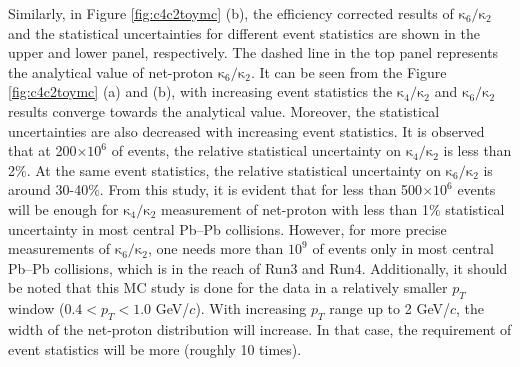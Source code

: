 Similarly, in Figure \ref{fig:c4c2toymc} (b), the efficiency corrected results of $\mathrm{\kappa}_{6}/\mathrm{\kappa}_{2}$ and the statistical uncertainties for different event statistics are shown in the upper and lower panel, respectively. The dashed line in the top panel represents the analytical value of net-proton $\mathrm{\kappa}_{6}/\mathrm{\kappa}_{2}$. It can be seen from the Figure \ref{fig:c4c2toymc} (a) and (b), with increasing event statistics the $\mathrm{\kappa}_{4}/\mathrm {\kappa}_{2}$ and $\mathrm{\kappa}_{6}/\mathrm{\kappa}_{2}$ results converge towards the analytical value. Moreover, the statistical uncertainties are also decreased with increasing event statistics. It is observed that at 200$\times 10^{6}$ of events, the relative statistical uncertainty on $\mathrm{\kappa}_{4}/\mathrm {\kappa}_{2}$ is less than 2$\%$. At the same event statistics, the relative statistical uncertainty on $\mathrm{\kappa}_{6}/\mathrm{\kappa}_{2}$ is around 30-40$\%$. From this study, it is evident that for less than 500$\times 10^{6}$ events will be enough for $\mathrm{\kappa}_{4}/\mathrm {\kappa}_{2}$ measurement of net-proton with less than 1$\%$ statistical uncertainty in most central Pb--Pb collisions. However, for more precise measurements of $\mathrm{\kappa}_{6}/\mathrm {\kappa}_{2}$, one needs more than $10^{9}$ of events only in most central Pb--Pb collisions, which is in the reach of Run3 and Run4. Additionally, it should be noted that this MC study is done for the data in a relatively smaller $p_{T}$ window ($0.4 < p_{T} < 1.0$ GeV/$c$). With increasing $p_{T}$ range up to 2 GeV/$c$, the width of the net-proton distribution will increase. In that case, the requirement of event statistics will be more (roughly 10 times).
 


